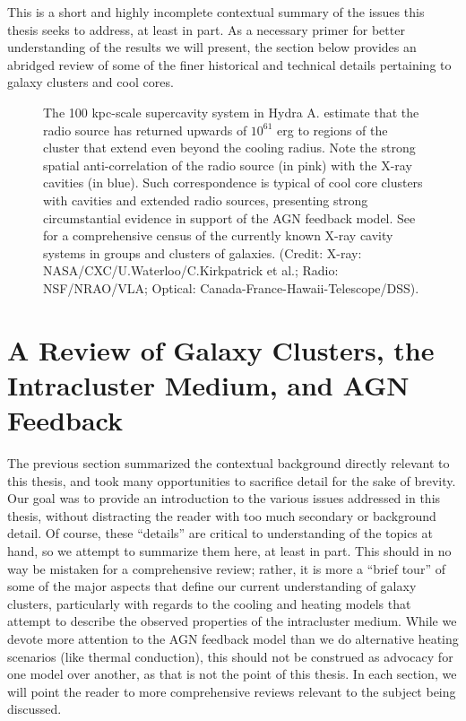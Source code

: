 This is a short and highly incomplete contextual summary of the issues 
this thesis seeks to address, at least in part. 
As a necessary primer for better understanding of the results we will present, 
the section below provides an abridged review of some of the finer historical and technical 
details pertaining to galaxy clusters and cool cores. 




\begin{figure}
\caption[X-ray supercavities in the Hydra A galaxy cluster]{The 100 kpc-scale supercavity system in Hydra A. \citet{wise07}
estimate that the radio source has returned upwards of $10^{61}$ erg to regions
of the cluster that extend even beyond the cooling radius. Note the strong
spatial anti-correlation of the radio source (in pink) with the X-ray cavities
(in blue). Such correspondence is typical of cool core clusters with cavities
and extended radio sources, presenting strong circumstantial evidence in
support of the AGN feedback model. See \citet{birzan04} for a comprehensive
census of the currently known X-ray cavity systems in groups and clusters of
galaxies. (Credit: X-ray: NASA/CXC/U.Waterloo/C.Kirkpatrick et al.; Radio:
NSF/NRAO/VLA; Optical: Canada-France-Hawaii-Telescope/DSS).}
\end{figure}



\clearpage




\section{A Review of Galaxy Clusters, the Intracluster Medium, and AGN Feedback}




The previous section summarized the contextual background directly relevant to
this thesis, and took many opportunities to sacrifice detail for the sake of
brevity.  Our goal was to provide an introduction to the various issues
addressed in this thesis, without distracting the reader with too much
secondary or background detail.  Of course, these ``details'' are critical to
understanding of the topics at hand, so we attempt to summarize
them here, at least in part. This should in no way be mistaken for a
comprehensive review; rather, it is more a ``brief tour'' of some of the major
aspects that define our current understanding of galaxy clusters, particularly
with regards to the cooling and heating models that attempt to describe the
observed properties of the intracluster medium.  While we devote more attention
to the AGN feedback model than we do alternative heating scenarios (like
thermal conduction), this should not be construed as advocacy for one model
over another, as that is not the point of this thesis.  In each section, we
will point the reader to more comprehensive reviews relevant to the subject
being discussed.







